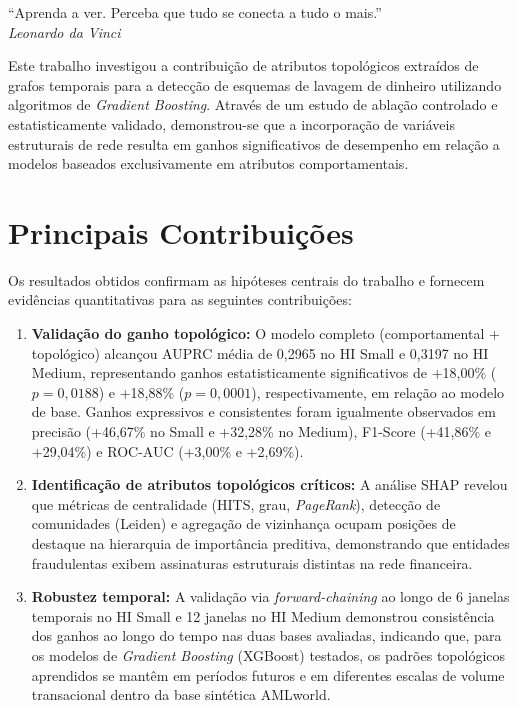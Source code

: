 \documentclass[titlepage,a4paper,oneside,onecolumn,12pt]{report}
\newenvironment{epigrafeonline}{\begin{flushright}\begin{minipage}{0.55\textwidth}}{\end{minipage}\end{flushright}}
\begin{document}
\begin{epigrafeonline}
\hfill ``Aprenda a ver. Perceba que tudo se conecta a tudo o mais.''\hspace{0.2cm}\null\\
\hspace*{\fill}\textit{Leonardo da Vinci}\\
\end{epigrafeonline}

Este trabalho investigou a contribuição de atributos topológicos extraídos de grafos temporais para a detecção de esquemas de lavagem de dinheiro utilizando algoritmos de \textit{Gradient Boosting}. Através de um estudo de ablação controlado e estatisticamente validado, demonstrou-se que a incorporação de variáveis estruturais de rede resulta em ganhos significativos de desempenho em relação a modelos baseados exclusivamente em atributos comportamentais.

\section*{Principais Contribuições}

Os resultados obtidos confirmam as hipóteses centrais do trabalho e fornecem evidências quantitativas para as seguintes contribuições:

\begin{enumerate}
    \item \textbf{Validação do ganho topológico:} O modelo completo (comportamental + topológico) alcançou AUPRC média de 0,2965 no HI Small e 0,3197 no HI Medium, representando ganhos estatisticamente significativos de +18,00\% ($p = 0{,}0188$) e +18,88\% ($p = 0{,}0001$), respectivamente, em relação ao modelo de base. Ganhos expressivos e consistentes foram igualmente observados em precisão (+46,67\% no Small e +32,28\% no Medium), F1-Score (+41,86\% e +29,04\%) e ROC-AUC (+3,00\% e +2,69\%).
    
    \item \textbf{Identificação de atributos topológicos críticos:} A análise SHAP revelou que métricas de centralidade (HITS, grau, \textit{PageRank}), detecção de comunidades (Leiden) e agregação de vizinhança ocupam posições de destaque na hierarquia de importância preditiva, demonstrando que entidades fraudulentas exibem assinaturas estruturais distintas na rede financeira.
    
    \item \textbf{Robustez temporal:} A validação via \textit{forward-chaining} ao longo de 6 janelas temporais no HI Small e 12 janelas no HI Medium demonstrou consistência dos ganhos ao longo do tempo nas duas bases avaliadas, indicando que, para os modelos de \textit{Gradient Boosting} (XGBoost) testados, os padrões topológicos aprendidos se mantêm em períodos futuros e em diferentes escalas de volume transacional dentro da base sintética AMLworld.
\end{enumerate}
\end{document}
